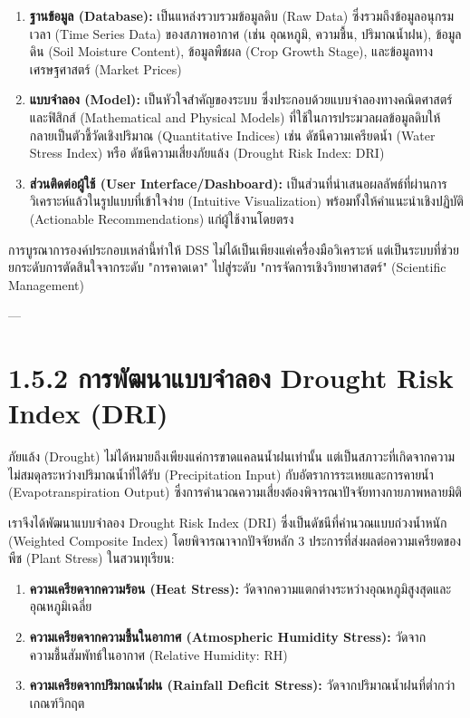 \documentclass[11pt,a4paper,openany]{report}
\begin{document}
\begin{enumerate}
  \item \textbf{ฐานข้อมูล (Database):} เป็นแหล่งรวบรวมข้อมูลดิบ (Raw Data) ซึ่งรวมถึงข้อมูลอนุกรมเวลา (Time Series Data) ของสภาพอากาศ (เช่น อุณหภูมิ, ความชื้น, ปริมาณน้ำฝน), ข้อมูลดิน (Soil Moisture Content), ข้อมูลพืชผล (Crop Growth Stage), และข้อมูลทางเศรษฐศาสตร์ (Market Prices)
  \item \textbf{แบบจำลอง (Model):} เป็นหัวใจสำคัญของระบบ ซึ่งประกอบด้วยแบบจำลองทางคณิตศาสตร์และฟิสิกส์ (Mathematical and Physical Models) ที่ใช้ในการประมวลผลข้อมูลดิบให้กลายเป็นตัวชี้วัดเชิงปริมาณ (Quantitative Indices) เช่น ดัชนีความเครียดน้ำ (Water Stress Index) หรือ ดัชนีความเสี่ยงภัยแล้ง (Drought Risk Index: DRI)
  \item \textbf{ส่วนติดต่อผู้ใช้ (User Interface/Dashboard):} เป็นส่วนที่นำเสนอผลลัพธ์ที่ผ่านการวิเคราะห์แล้วในรูปแบบที่เข้าใจง่าย (Intuitive Visualization) พร้อมทั้งให้คำแนะนำเชิงปฏิบัติ (Actionable Recommendations) แก่ผู้ใช้งานโดยตรง
\end{enumerate}


การบูรณาการองค์ประกอบเหล่านี้ทำให้ DSS ไม่ได้เป็นเพียงแค่เครื่องมือวิเคราะห์ แต่เป็นระบบที่ช่วยยกระดับการตัดสินใจจากระดับ "การคาดเดา" ไปสู่ระดับ "การจัดการเชิงวิทยาศาสตร์" (Scientific Management)

---

\section{1.5.2 การพัฒนาแบบจำลอง Drought Risk Index (DRI)}


ภัยแล้ง (Drought) ไม่ได้หมายถึงเพียงแค่การขาดแคลนน้ำฝนเท่านั้น แต่เป็นสภาวะที่เกิดจากความไม่สมดุลระหว่างปริมาณน้ำที่ได้รับ (Precipitation Input) กับอัตราการระเหยและการคายน้ำ (Evapotranspiration Output) ซึ่งการคำนวณความเสี่ยงต้องพิจารณาปัจจัยทางกายภาพหลายมิติ

เราจึงได้พัฒนาแบบจำลอง Drought Risk Index (DRI) ซึ่งเป็นดัชนีที่คำนวณแบบถ่วงน้ำหนัก (Weighted Composite Index) โดยพิจารณาจากปัจจัยหลัก 3 ประการที่ส่งผลต่อความเครียดของพืช (Plant Stress) ในสวนทุเรียน:

\begin{enumerate}
  \item \textbf{ความเครียดจากความร้อน (Heat Stress):} วัดจากความแตกต่างระหว่างอุณหภูมิสูงสุดและอุณหภูมิเฉลี่ย
  \item \textbf{ความเครียดจากความชื้นในอากาศ (Atmospheric Humidity Stress):} วัดจากความชื้นสัมพัทธ์ในอากาศ (Relative Humidity: RH)
  \item \textbf{ความเครียดจากปริมาณน้ำฝน (Rainfall Deficit Stress):} วัดจากปริมาณน้ำฝนที่ต่ำกว่าเกณฑ์วิกฤต
\end{enumerate}
\end{document}
